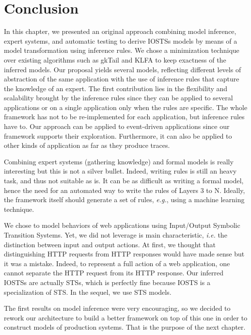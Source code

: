 
\section{Conclusion}
\label{sec:modelinf:webapps:conclusion}

In this chapter, we presented an original approach combining
model inference, expert systems, and automatic testing to derive
IOSTSs models by means of a model transformation using inference
rules.  We chose a minimization technique over existing
algorithms such as gkTail and KLFA to keep exactness of the
inferred models. Our proposal yields several models, reflecting
different levels of abstraction of the same application with the
use of inference rules that capture the knowledge of an expert.
The first contribution lies in the flexibility and scalability
brought by the inference rules since they can be applied to
several applications or on a single application only when the
rules are specific. The whole framework has not to be
re-implemented for each application, but inference rules have to.
Our approach can be applied to event-driven applications since
our framework supports their exploration. Furthermore, it can
also be applied to other kinds of application as far as they
produce traces.

Combining expert systems (gathering knowledge) and formal models
is really interesting but this is not a silver bullet. Indeed,
writing rules is still an heavy task, and thus not suitable as
is. It can be as difficult as writing a formal model, hence the
need for an automated way to write the rules of Layers 3 to N.
Ideally, the framework itself should generate a set of rules,
\emph{e.g.}, using a machine learning technique.

We chose to model behaviors of web applications using
Input/Output Symbolic Transition Systems. Yet, we did not
leverage is main characteristic, \emph{i.e.} the distinction
between input and output actions. At first, we thought that
distinguishing HTTP requests from HTTP responses would have made
sense but it was a mistake. Indeed, to represent a full action of
a web application, one cannot separate the HTTP request from its
HTTP response. Our inferred IOSTSs are actually STSs, which is
perfectly fine because IOSTS is a specialization of STS. In the
sequel, we use STS models.

The first results on model inference were very encouraging, so we
decided to rework our architecture to build a better framework on
top of this one in order to construct models of production
systems. That is the purpose of the next chapter.
